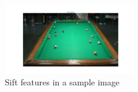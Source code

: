 \begin{figure}
    \centering
    \includegraphics[width=0.5\textwidth]{./imgs/sift.png}
    \caption{Sift features in a sample image}
    \label{fig:sift}
\end{figure}
